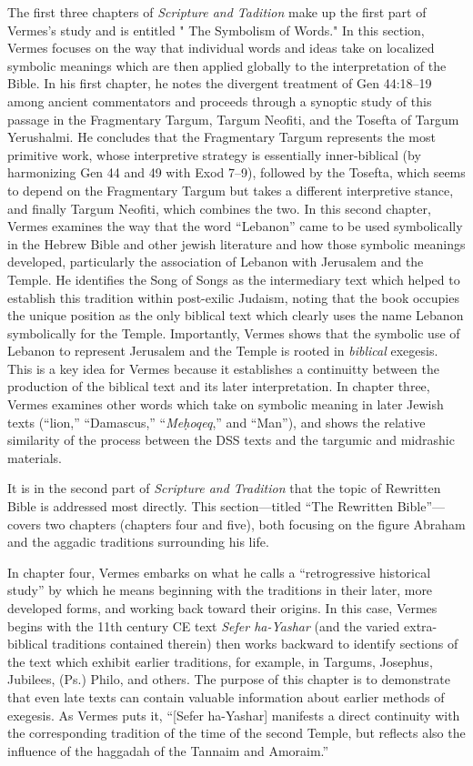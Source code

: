 The first three chapters of \emph{Scripture and Tadition} make up the
first part of Vermes's study and is entitled " The Symbolism of Words."
In this section, Vermes focuses on the way that individual words and
ideas take on localized symbolic meanings which are then applied
globally to the interpretation of the Bible. In his first chapter, he
notes the divergent treatment of Gen 44:18--19 among ancient
commentators and proceeds through a synoptic study of this passage in
the Fragmentary Targum, Targum Neofiti, and the Tosefta of Targum
Yerushalmi. He concludes that the Fragmentary Targum represents the most
primitive work, whose interpretive strategy is essentially
inner-biblical (by harmonizing Gen 44 and 49 with Exod 7--9), followed
by the Tosefta, which seems to depend on the Fragmentary Targum but
takes a different interpretive stance, and finally Targum Neofiti, which
combines the two. In this second chapter, Vermes examines the way that
the word ``Lebanon'' came to be used symbolically in the Hebrew Bible
and other jewish literature and how those symbolic meanings developed,
particularly the association of Lebanon with Jerusalem and the Temple.
He identifies the Song of Songs as the intermediary text which helped to
establish this tradition within post-exilic Judaism, noting that the
book occupies the unique position as the only biblical text which
clearly uses the name Lebanon symbolically for the Temple. Importantly,
Vermes shows that the symbolic use of Lebanon to represent Jerusalem and
the Temple is rooted in \emph{biblical} exegesis. This is a key idea for
Vermes because it establishes a continuitty between the production of
the biblical text and its later interpretation. In chapter three, Vermes
examines other words which take on symbolic meaning in later Jewish
texts (``lion,'' ``Damascus,'' ``\emph{Meḥoqeq},'' and ``Man''), and
shows the relative similarity of the process between the DSS texts and
the targumic and midrashic materials.

It is in the second part of \emph{Scripture and Tradition} that the
topic of Rewritten Bible is addressed most directly. This
section---titled ``The Rewritten Bible''--- covers two chapters
(chapters four and five), both focusing on the figure Abraham and the
aggadic traditions surrounding his life.

In chapter four, Vermes embarks on what he calls a ``retrogressive
historical study'' by which he means beginning with the traditions in
their later, more developed forms, and working back toward their
origins. In this case, Vermes begins with the 11th century CE text
\emph{Sefer ha-Yashar} (and the varied extra-biblical traditions
contained therein) then works backward to identify sections of the text
which exhibit earlier traditions, for example, in Targums, Josephus,
Jubilees, (Ps.) Philo, and others. The purpose of this chapter is to
demonstrate that even late texts can contain valuable information about
earlier methods of exegesis. As Vermes puts it, ``{[}Sefer ha-Yashar{]}
manifests a direct continuity with the corresponding tradition of the
time of the second Temple, but reflects also the influence of the
haggadah of the Tannaim and Amoraim.''\autocite[95]{vermes1961}

